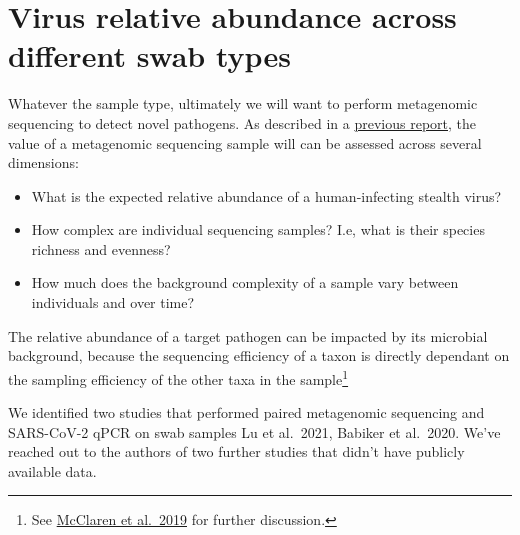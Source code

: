 \documentclass[
  letterpaper,
  DIV=11,
  numbers=noendperiod]{scrartcl}
\providecommand{\tightlist}{%
  \setlength{\itemsep}{0pt}\setlength{\parskip}{0pt}}\usepackage{longtable,booktabs,array}
\begin{document}
\section{Virus relative abundance across different swab
types}\label{virus-relative-abundance-across-different-swab-types}

Whatever the sample type, ultimately we will want to perform metagenomic
sequencing to detect novel pathogens. As described in a
\href{https://naobservatory.org/reports/comparing-sampling-strategies-for-early-detection-of-stealth-biothreats/}{previous
report}, the value of a metagenomic sequencing sample will can be
assessed across several dimensions:

\begin{itemize}
\tightlist
\item
  What is the expected relative abundance of a human-infecting stealth
  virus?
\item
  How complex are individual sequencing samples? I.e, what is their
  species richness and evenness?
\item
  How much does the background complexity of a sample vary between
  individuals and over time?
\end{itemize}

The relative abundance of a target pathogen can be impacted by its
microbial background, because the sequencing efficiency of a taxon is
directly dependant on the sampling efficiency of the other taxa in the
sample\footnote{See
  \href{https://elifesciences.org/articles/46923}{McClaren et al.~2019}
  for further discussion.}

We identified two studies that performed paired metagenomic sequencing
and SARS-CoV-2 qPCR on swab samples Lu et al.~2021, Babiker et al.~2020.
We've reached out to the authors of two further studies that didn't have
publicly available data.
\end{document}
